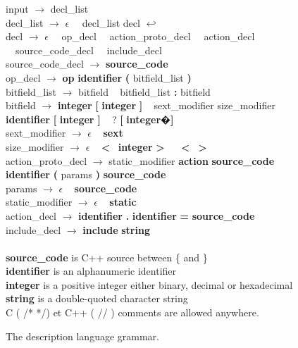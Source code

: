 \begin{figure}[p]
input $\rightarrow$ decl\_list\\
decl\_list $\rightarrow$ $\epsilon$ \textbar~~decl\_list decl {\bf $\hookleftarrow$}\\
decl $\rightarrow$ $\epsilon$ \textbar~~op\_decl \textbar~~action\_proto\_decl \textbar~~action\_decl \textbar~~source\_code\_decl \textbar~~include\_decl\\
source\_code\_decl $\rightarrow$ {\bf source\_code}\\
op\_decl $\rightarrow$ {\bf op} {\bf identifier} {\bf (} bitfield\_list {\bf )}\\
bitfield\_list $\rightarrow$ bitfield \textbar~ bitfield\_list {\bf :} bitfield\\
bitfield $\rightarrow$ {\bf integer} {\bf [} {\bf integer} {\bf ]} \textbar~ sext\_modifier size\_modifier {\bf identifier} {\bf [} {\bf integer} {\bf ]} \textbar~ ? {\bf [} {\bf integer}�{\bf ]}\\
sext\_modifier $\rightarrow$ $\epsilon$ \textbar~ {\bf sext}\\
size\_modifier $\rightarrow$ $\epsilon$ \textbar~ {\bf \textless}~ {\bf integer} {\bf \textgreater}~ \textbar~ {\bf \textless}~ {\bf \textgreater}~\\
action\_proto\_decl $\rightarrow$ static\_modifier {\bf action} {\bf source\_code} {\bf identifier} {\bf (} params {\bf )} {\bf source\_code}\\
params $\rightarrow$ $\epsilon$ \textbar~ {\bf source\_code}\\
static\_modifier $\rightarrow$ $\epsilon$ \textbar~ {\bf static}\\
action\_decl $\rightarrow$ {\bf identifier} {\bf.} {\bf identifier} {\bf =} {\bf source\_code}\\
include\_decl $\rightarrow$ {\bf include} {\bf string}\\
\\
{\bf source\_code} is C++ source between \{ and \}\\
{\bf identifier} is an alphanumeric identifier\\
{\bf integer} is a positive integer either binary, decimal or hexadecimal\\
{\bf string} is a double-quoted character string\\
C ( /* */) et C++ ( // ) comments are allowed anywhere.
\caption{The description language grammar.}
\label{grammar}
\end{figure}
